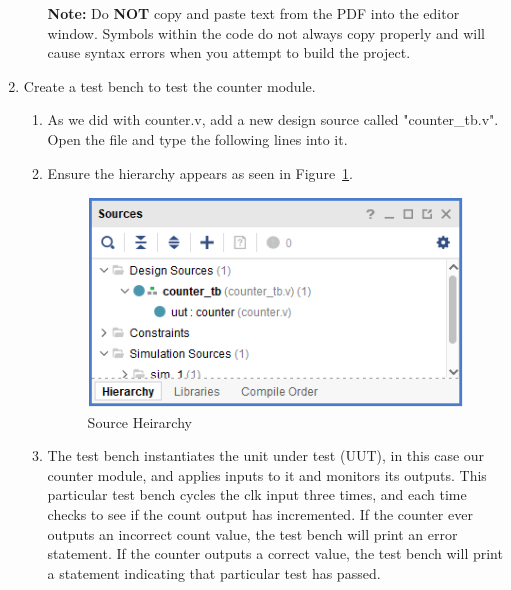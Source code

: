 \documentclass[11pt,twoside,titlepage]{article}
\begin{document}
\begin{enumerate}
\begin{enumerate}
		\begin{minipage}{\linewidth}
			
		\end{minipage}
		
		
		\textbf{Note:} Do \textbf{NOT} copy and paste text from the PDF into the editor window. Symbols within the code do not always copy properly and will cause syntax errors when you attempt to build the project.
		
		
	\end{enumerate}
	
	\item Create a test bench to test the counter module.
	\vspace{-1em}
	\begin{enumerate}
		\item As we did with counter.v, add a new design source called "counter\_tb.v". Open the file and type the following lines into it. 
		
		\begin{minipage}{\linewidth}
			
		\end{minipage}  
		
		\item  Ensure the hierarchy appears as seen in Figure~\ref{heirarchy}.
		
		\begin{figure}[!h]
			\centering
			\includegraphics[width=.5\textwidth]{heirarchy}
			\caption{Source Heirarchy}
			\label{heirarchy}
		\end{figure}
		
		
		\item The test bench instantiates the unit under test (UUT), in this case our counter module, and applies inputs to it and monitors its outputs. This particular test bench cycles the clk input three times, and each time checks to see if the count output has incremented. If the counter ever outputs an incorrect count value, the test bench will print an error statement. If the counter outputs a correct value, the test bench will print a statement indicating that particular test has passed.
	\end{enumerate}


\end{enumerate}
\end{document}
